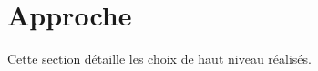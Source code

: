 \documentclass{article}
\begin{document}















\section{Approche}
Cette section détaille les choix de haut niveau réalisés.
\end{document}
